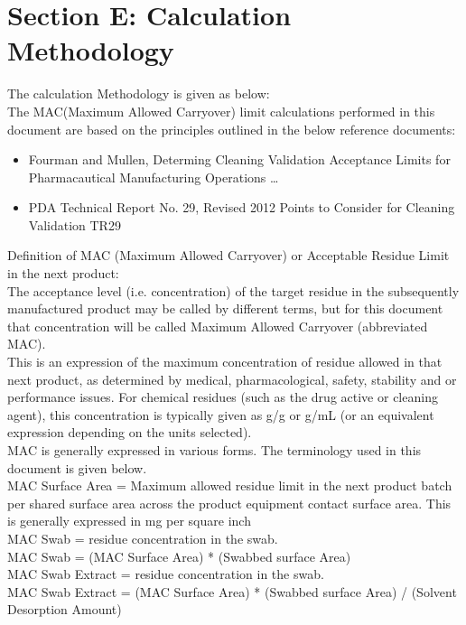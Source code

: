 \documentclass{article}
\begin{document}
        \section{Section E: Calculation Methodology}
        The calculation Methodology is given as below:\\
        The MAC(Maximum Allowed Carryover) limit calculations performed in this document are based on the principles outlined in the below reference documents:\\
        \begin{itemize}
        \item Fourman and Mullen, Determing Cleaning Validation Acceptance Limits for Pharmacautical Manufacturing Operations \dots{}
        \item PDA Technical Report No. 29, Revised 2012 Points to Consider for Cleaning Validation TR29
        \end{itemize}
        Definition of MAC (Maximum Allowed Carryover) or Acceptable Residue Limit in the next product:\\
        The acceptance level (i.e. concentration) of the target residue in the subsequently manufactured product may be called by different terms, but for this document that concentration will be called Maximum Allowed Carryover (abbreviated MAC).\\
        This is an expression of the maximum concentration of residue allowed in that next product, as determined by medical, pharmacological, safety, stability and
        or performance issues. For chemical residues (such as the drug active or cleaning agent), this concentration is typically given
        as {\textmu}g/g or {\textmu}g/mL (or an equivalent expression depending on the units selected).\\
        MAC is generally expressed in various forms. The terminology used in this document is given below.\\
        MAC Surface Area = Maximum allowed residue limit in the next product batch per shared surface area across the product equipment contact surface area. This is generally expressed in mg per square inch\\
        MAC Swab = residue concentration in the swab.\\
        MAC Swab = (MAC Surface Area) * (Swabbed surface Area)\\
        MAC Swab Extract = residue concentration in the swab.\\
        MAC Swab Extract = (MAC Surface Area) * (Swabbed surface Area) / (Solvent Desorption Amount)\\
        \newpage
\end{document}
